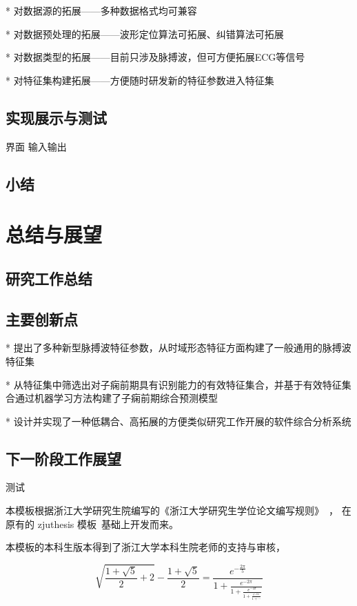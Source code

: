 * 对数据源的拓展——多种数据格式均可兼容

* 对数据预处理的拓展——波形定位算法可拓展、纠错算法可拓展

* 对数据类型的拓展——目前只涉及脉搏波，但可方便拓展ECG等信号

* 对特征集构建拓展——方便随时研发新的特征参数进入特征集

\section{实现展示与测试}
界面
输入输出
\section{小结}

\chapter{总结与展望}
\section{研究工作总结}
\section{主要创新点}
* 提出了多种新型脉搏波特征参数，从时域形态特征方面构建了一般通用的脉搏波特征集

* 从特征集中筛选出对子痫前期具有识别能力的有效特征集合，并基于有效特征集合通过机器学习方法构建了子痫前期综合预测模型

* 设计并实现了一种低耦合、高拓展的方便类似研究工作开展的软件综合分析系统

\section{下一阶段工作展望}


测试

本模板根据浙江大学研究生院编写的《浙江大学研究生学位论文编写规则》~\cite{zjugradthesisrules,zjuthesis,tikz}，
在原有的 zjuthesis 模板~\cite{zjuthesis}基础上开发而来。

本模板的本科生版本\cite{zjuthesisrules}得到了浙江大学本科生院老师的支持与审核，

\begin{equation}
    \sqrt { \frac { 1 + \sqrt { 5 } } { 2 } + 2 } - \frac { 1 + \sqrt { 5 } } { 2 } = \frac { e ^ { - \frac { 2 \pi } { 5 } } } { 1 + \frac { e ^ { - 2 \pi } } { 1 + \frac { e ^ { - 4 \pi } } { 1 + \frac { e ^ { - 6 \pi } } { 1 + \cdots } } } }
\end{equation}

